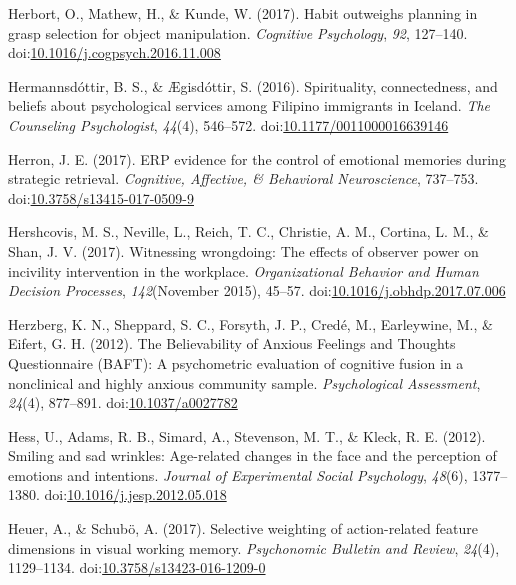 \documentclass[english,man]{apa6}
\theoremstyle{definition}
\theoremstyle{definition}
\theoremstyle{definition}
\theoremstyle{remark}
\begin{document}
\hypertarget{ref-Herbort2017}{}
Herbort, O., Mathew, H., \& Kunde, W. (2017). Habit outweighs planning
in grasp selection for object manipulation. \emph{Cognitive Psychology},
\emph{92}, 127--140.
doi:\href{https://doi.org/10.1016/j.cogpsych.2016.11.008}{10.1016/j.cogpsych.2016.11.008}

\hypertarget{ref-Hermannsdottir2016}{}
Hermannsdóttir, B. S., \& Ægisdóttir, S. (2016). Spirituality,
connectedness, and beliefs about psychological services among Filipino
immigrants in Iceland. \emph{The Counseling Psychologist}, \emph{44}(4),
546--572.
doi:\href{https://doi.org/10.1177/0011000016639146}{10.1177/0011000016639146}

\hypertarget{ref-Herron2017}{}
Herron, J. E. (2017). ERP evidence for the control of emotional memories
during strategic retrieval. \emph{Cognitive, Affective, \& Behavioral
Neuroscience}, 737--753.
doi:\href{https://doi.org/10.3758/s13415-017-0509-9}{10.3758/s13415-017-0509-9}

\hypertarget{ref-Hershcovis2017}{}
Hershcovis, M. S., Neville, L., Reich, T. C., Christie, A. M., Cortina,
L. M., \& Shan, J. V. (2017). Witnessing wrongdoing: The effects of
observer power on incivility intervention in the workplace.
\emph{Organizational Behavior and Human Decision Processes},
\emph{142}(November 2015), 45--57.
doi:\href{https://doi.org/10.1016/j.obhdp.2017.07.006}{10.1016/j.obhdp.2017.07.006}

\hypertarget{ref-Herzberg2012}{}
Herzberg, K. N., Sheppard, S. C., Forsyth, J. P., Credé, M., Earleywine,
M., \& Eifert, G. H. (2012). The Believability of Anxious Feelings and
Thoughts Questionnaire (BAFT): A psychometric evaluation of cognitive
fusion in a nonclinical and highly anxious community sample.
\emph{Psychological Assessment}, \emph{24}(4), 877--891.
doi:\href{https://doi.org/10.1037/a0027782}{10.1037/a0027782}

\hypertarget{ref-Hess2012}{}
Hess, U., Adams, R. B., Simard, A., Stevenson, M. T., \& Kleck, R. E.
(2012). Smiling and sad wrinkles: Age-related changes in the face and
the perception of emotions and intentions. \emph{Journal of Experimental
Social Psychology}, \emph{48}(6), 1377--1380.
doi:\href{https://doi.org/10.1016/j.jesp.2012.05.018}{10.1016/j.jesp.2012.05.018}

\hypertarget{ref-Heuer2016}{}
Heuer, A., \& Schubö, A. (2017). Selective weighting of action-related
feature dimensions in visual working memory. \emph{Psychonomic Bulletin
and Review}, \emph{24}(4), 1129--1134.
doi:\href{https://doi.org/10.3758/s13423-016-1209-0}{10.3758/s13423-016-1209-0}
\end{document}

